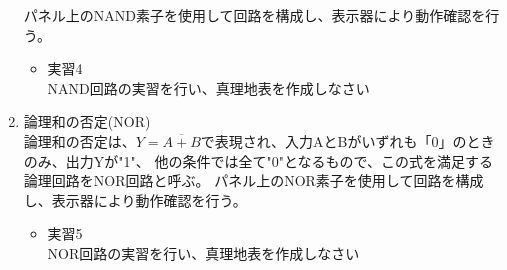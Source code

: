 \documentclass[dvipdfmx]{jsarticle}
\begin{document}
\begin{enumerate}
							パネル上のNAND素子を使用して回路を構成し、表示器により動作確認を行う。
							\begin{itemize}
								\item 実習4 \\
									NAND回路の実習を行い、真理地表を作成しなさい
							\end{itemize}
						\item 論理和の否定(NOR) \\
							論理和の否定は、$Y=\overline{A + B}$で表現され、入力AとBがいずれも「0」のときのみ、出力Yが"1"、
							他の条件では全て"0"となるもので、この式を満足する論理回路をNOR回路と呼ぶ。
							パネル上のNOR素子を使用して回路を構成し、表示器により動作確認を行う。
							\begin{itemize}
								\item 実習5 \\
									NOR回路の実習を行い、真理地表を作成しなさい
							\end{itemize}
					\end{enumerate}
\end{document}
